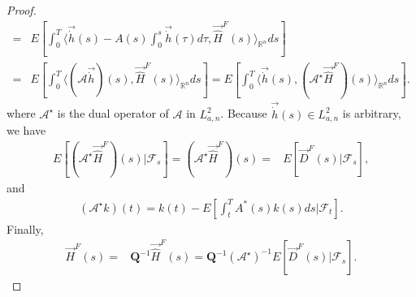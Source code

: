 \documentclass[11pt]{article}
\numberwithin{equation}{section}%
\numberwithin{figure}{section}%
\theoremstyle{remark}
\begin{document}
\begin{proof}
\begin{align*}
			=&E\left[\int_{0}^{T}\langle \vec{\dot{h}}(s)- A(s)\int_{0}^{s}\vec{\dot{h}}(\tau) d\tau,\vec{\hat{H}}^{F}(s)\rangle_{\mathbb{R}^{n}}ds\right] \\
			=&E\left[\int_{0}^{T}\langle(\mathcal{A}\vec{\dot{h}})(s),\vec{\hat{H}}^{F}(s)\rangle_{\mathbb{R}^{n}} ds\right]=E\left[\int_{0}^{T}\langle\vec{\dot{h}}(s),(\mathcal{A}^{\star}\vec{\hat{H}}^{F})(s)\rangle_{\mathbb{R}^{n}} ds\right].
		\end{align*}
		where $\mathcal{A}^{\star}$ is the dual operator of  $\mathcal{A}$ in $L_{a,n}^{2}$.
		Because $\vec{\dot{h}}(s)\in L_{a,n}^{2}$ is arbitrary, we have	
		\begin{align*}
			E\left[(\mathcal{A}^{\star}\vec{\hat{H}}^{F})(s)|\mathcal{F}_{s}\right]=(\mathcal{A}^{\star}\vec{\hat{H}}^{F})(s)
			=& E[\vec{D}^{F}(s)|\mathcal{F}_{s}],
		\end{align*}
		and 
		\begin{align*}	
			(\mathcal{A}^{\star}k)(t)=k(t)-E\left[\int_{t}^{T}A^{*}(s)k(s)ds|\mathcal{F}_{t}\right].
		\end{align*}			
		Finally,
		\begin{align*}
			\vec{H}^{F}(s)
			=&\mathbf{Q}^{-1}\vec{\hat{H}}^{F}(s)=\mathbf{Q}^{-1}(\mathcal{A}^{\star})^{-1} E[\vec{D}^{F}(s)|\mathcal{F}_{s}].
		\end{align*}
	\end{proof}
\end{document}
